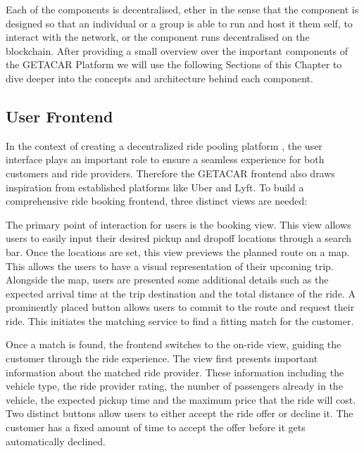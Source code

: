 Each of the components is decentralised, ether in the sense that the component is designed so that an individual or a group is able to run and host it them self, to interact with the network, or the component runs decentralised on the blockchain. After providing a small overview over the important components of the GETACAR Platform we will use the following Sections of this Chapter to dive deeper into the concepts and architecture behind each component. 

\subsection{User Frontend}\label{subsec:UserFrontend}
In the context of creating a decentralized ride pooling platform , the user interface plays an important role to ensure a seamless experience for both customers and ride providers. Therefore the GETACAR frontend also draws inspiration from established platforms like Uber and Lyft. To build a comprehensive ride booking frontend, three distinct views are needed:

The primary point of interaction for users is the booking view. This view allows users to easily input their desired pickup and dropoff locations through a search bar. Once the locations are set, this view previews the planned route on a map. This allows the users to have a visual representation of their upcoming trip. Alongside the map, users are presented some additional details such as the expected arrival time at the trip destination and the total distance of the ride. A prominently placed button allows users to commit to the route and request their ride. This initiates the matching service to find a fitting match for the customer.

Once a match is found, the frontend switches to the on-ride view, guiding the customer through the ride experience. The view first presents important information about the matched ride provider. These information including the vehicle type, the ride provider rating, the number of passengers already in the vehicle, the expected pickup time and the maximum price that the ride will cost. Two distinct buttons allow users to either accept the ride offer or decline it. The customer has a fixed amount of time to accept the offer before it gets automatically declined. 

